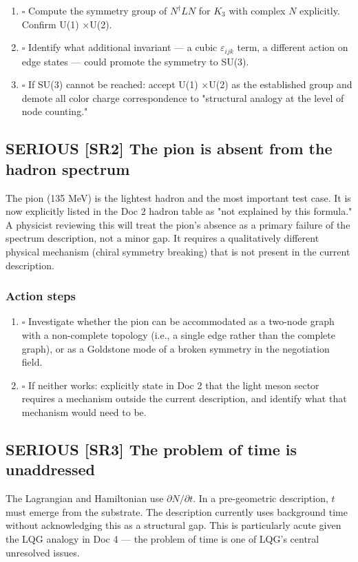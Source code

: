 \documentclass[11pt,letterpaper]{article}
\begin{document}
\begin{enumerate}
\item{$\square$} Compute the symmetry group of \(N^\dagger L N\) for \(K_3\) with complex
\(N\) explicitly. Confirm U(1) ×U(2).
\item{$\square$} Identify what additional invariant --- a cubic \(\varepsilon_{ijk}\) term,
a different action on edge states --- could promote the symmetry to SU(3).
\item{$\square$} If SU(3) cannot be reached: accept U(1) ×U(2) as the established group
and demote all color charge correspondence to "structural analogy at the level
of node counting."
\end{enumerate}

\subsection{{\bfseries\sffamily SERIOUS} [SR2] The pion is absent from the hadron spectrum}
\label{sec:orgb5c215c}
The pion (135 MeV) is the lightest hadron and the most important test case.
It is now explicitly listed in the Doc 2 hadron table as "not explained by this
formula." A physicist reviewing this will treat the pion's absence as a primary
failure of the spectrum description, not a minor gap. It requires a qualitatively
different physical mechanism (chiral symmetry breaking) that is not present in
the current description.

\subsubsection{Action steps}
\label{sec:org02f87bc}

\begin{enumerate}
\item{$\square$} Investigate whether the pion can be accommodated as a two-node graph with
a non-complete topology (i.e., a single edge rather than the complete graph),
or as a Goldstone mode of a broken symmetry in the negotiation field.
\item{$\square$} If neither works: explicitly state in Doc 2 that the light meson sector
requires a mechanism outside the current description, and identify what that
mechanism would need to be.
\end{enumerate}

\subsection{{\bfseries\sffamily SERIOUS} [SR3] The problem of time is unaddressed}
\label{sec:org6231f6e}
The Lagrangian and Hamiltonian use \(\partial N/\partial t\). In a pre-geometric
description, \(t\) must emerge from the substrate. The description currently uses
background time without acknowledging this as a structural gap. This is
particularly acute given the LQG analogy in Doc 4 --- the problem of time is one
of LQG's central unresolved issues.
\end{document}
